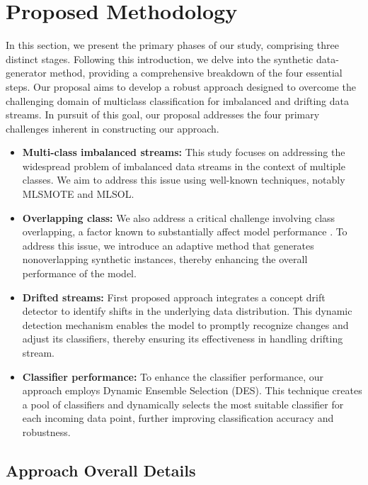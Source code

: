 \section{Proposed Methodology}
\label{sec:4_first_proposed_approach}

In this section, we present the primary phases of our study, comprising three distinct stages. Following this introduction, we delve into the synthetic data-generator method, providing a comprehensive breakdown of the four essential steps. Our proposal aims to develop a robust approach designed to overcome the challenging domain of multiclass classification for imbalanced and drifting data streams. In pursuit of this goal, our proposal addresses the four primary challenges inherent in constructing our approach.
\begin{itemize}
	\item \textbf{Multi-class imbalanced streams:} This study focuses on addressing the widespread problem of imbalanced data streams in the context of multiple classes. We aim to address this issue using well-known techniques, notably MLSMOTE and MLSOL.
	\item \textbf{Overlapping class:} We also address a critical challenge involving class overlapping, a factor known to substantially affect model performance \cite{cruz2017meta, widmer1996learning}. To address this issue, we introduce an adaptive method that generates nonoverlapping synthetic instances, thereby enhancing the overall performance of the model.
	\item \textbf{Drifted streams:} First proposed approach integrates a concept drift detector to identify shifts in the underlying data distribution. This dynamic detection mechanism enables the model to promptly recognize changes and adjust its classifiers, thereby ensuring its effectiveness in handling drifting stream.
	\item \textbf{Classifier performance:} To enhance the classifier performance, our approach employs Dynamic Ensemble Selection (DES). This technique creates a pool of classifiers and dynamically selects the most suitable classifier for each incoming data point, further improving classification accuracy and robustness.
\end{itemize}

\subsection{Approach Overall Details}

